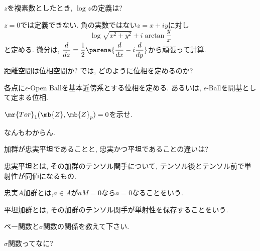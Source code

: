 \begin{prob}
$z$を複素数としたとき, $\log{z}$の定義は? 
\end{prob}

\begin{ans}
$z=0$では定義できない. 負の実数ではない$z=x+iy$に対し
\[\log{\sqrt{x^2+y^2}} + i\arctan{\dfrac{y}{x}}\]
と定める. 微分は, $\dfrac{d}{dz} = \dfrac{1}{2}\parena{\dfrac{d}{dx} - i\dfrac{d}{dy}}$から頑張って計算. 
\end{ans}

\begin{prob}
距離空間は位相空間か? では, どのように位相を定めるのか?
\end{prob}

\begin{ans}
各点に$\epsilon$-Open Ballを基本近傍系とする位相を定める. あるいは, $\epsilon$-Ballを開基として定まる位相. 
\end{ans}

\begin{prob}
$\mr{Tor}_{1}(\mb{Z},\mb{Z}_{p})=0$を示せ. 
\end{prob}

\begin{ans}
なんもわからん.
\end{ans}

\begin{prob}
加群が忠実平坦であることと, 忠実かつ平坦であることの違いは?
\end{prob}

\begin{ans}
忠実平坦とは, その加群のテンソル関手について, テンソル後とテンソル前で単射性が同値になるもの. \par 
忠実$A$加群とは,$a\in A$が$aM=0$なら$a=0$なることをいう. \par 
平坦加群とは, その加群のテンソル関手が単射性を保存することをいう. 

\end{ans}

\begin{prob}
ペー関数と$\sigma$関数の関係を教えて下さい.
\end{prob}
\begin{ans}
$\sigma$関数ってなに? 
\end{ans}

